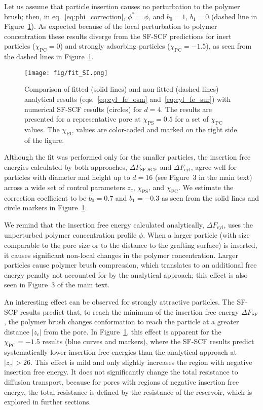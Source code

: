 \documentclass[10pt, a4paper]{article}
\begin{document}
\begin{multicols}{2}
Let us assume that particle insertion causes no perturbation to the polymer brush; then, in eq.~\ref{eq:phi_correction}, $\phi^{\ast} = \phi$, and $b_0 = 1$, $b_1 = 0$ (dashed line in Figure~\ref{fig:fit_SI}).
As expected because of the local perturbation to polymer concentration these results diverge from the SF-SCF predictions for inert particles ($\chi_{\textrm{PC}} = 0$) and strongly adsorbing particles ($\chi_{\textrm{PC}} = -1.5$), as seen from the dashed lines in Figure~\ref{fig:fit_SI}.

\begin{figure}[H]
    \centering
    \texttt{[image: fig/fit\_SI.png]}
    \caption{
    Comparison of fitted (solid lines) and non-fitted (dashed lines) analytical results (eqs.~\ref{eq:cyl_fe_osm} and~\ref{eq:cyl_fe_sur}) with numerical SF-SCF results (circles) for $d = 4$.
    The results are presented for a representative pore at $\chi_{\textrm{PS}} = 0.5$ for a set of $\chi_{\textrm{PC}}$ values.
    The $\chi_{\textrm{PC}}$ values are color-coded and marked on the right side of the figure.
    }
    \label{fig:fit_SI}
\end{figure}

Although the fit was performed only for the smaller particles, the insertion free energies calculated by both approaches, $\Delta F_{\textrm{SF-SCF}}$ and $\Delta F_{\textrm{cyl}}$, agree well for particles with diameter and height up to $d = 16$ (see Figure~3 in the main text) across a wide set of control parameters $z_c$, $\chi_{\textrm{PS}}$, and $\chi_{\textrm{PC}}$.
We estimate the correction coefficient to be $b_0=0.7$ and $b_1 = -0.3$ as seen from the solid lines and circle markers in Figure~\ref{fig:fit_SI}.

We remind that the insertion free energy calculated analytically, $\Delta F_{\textrm{cyl}}$, uses the unperturbed polymer concentration profile $\phi$.
When a larger particle (with size comparable to the pore size or to the distance to the grafting surface) is inserted, it causes significant non-local changes in the polymer concentration.
Larger particles cause polymer brush compression, which translates to an additional free energy penalty not accounted for by the analytical approach; this effect is also seen in Figure~3 of the main text.


An interesting effect can be observed for strongly attractive particles.
The SF-SCF results predict that, to reach the minimum of the insertion free energy $\Delta F_{\textrm{SF}}$, the polymer brush changes conformation to reach the particle at a greater distance $|z_c|$ from the pore.
In Figure~\ref{fig:fit_SI}, this effect is apparent for the $\chi_{\textrm{PC}} = -1.5$ results (blue curves and markers), where the SF-SCF results predict systematically lower insertion free energies than the analytical approach at $|z_c| > 26$.
This effect is mild and only slightly increases the region with negative insertion free energy.
It does not significantly change the total resistance to diffusion transport, because for pores with regions of negative insertion free energy, the total resistance is defined by the resistance of the reservoir, which is explored in further sections.



\end{multicols}
\end{document}
